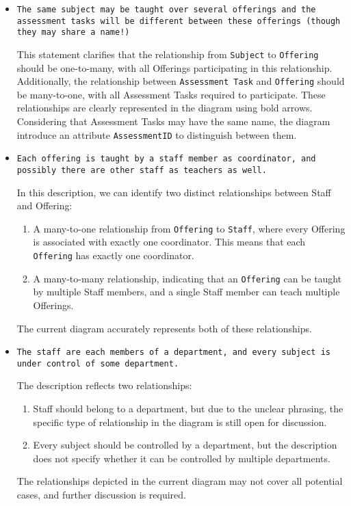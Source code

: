 \documentclass[a4paper,12pt]{article}
\begin{document}
\begin{itemize}
  \item \texttt{The same subject may be taught over several offerings and the assessment tasks will be different between these offerings (though they may share a name!)}

  This statement clarifies that the relationship from \texttt{Subject} to \texttt{Offering} should be one-to-many, with all Offerings participating in this relationship. Additionally, the relationship between \texttt{Assessment Task} and \texttt{Offering} should be many-to-one, with all Assessment Tasks required to participate. These relationships are clearly represented in the diagram using bold arrows. Considering that Assessment Tasks may have the same name, the diagram introduce an attribute \texttt{AssessmentID} to distinguish between them.

  \item \texttt{Each offering is taught by a staff member as coordinator, and possibly there are other staff as teachers as well. }

  In this description, we can identify two distinct relationships between Staff and Offering:
  \begin{enumerate}
    \item A many-to-one relationship from \texttt{Offering} to \texttt{Staff}, where every Offering is associated with exactly one coordinator. This means that each \texttt{Offering} has exactly one coordinator.

    \item A many-to-many relationship, indicating that an \texttt{Offering} can be taught by multiple Staff members, and a single Staff member can teach multiple Offerings.
  \end{enumerate}

  The current diagram accurately represents both of these relationships.


  \item \texttt{The staff are each members of a department, and every subject is under control of some department.}

  The description reflects two relationships:
    \begin{enumerate}
        \item Staff should belong to a department, but due to the unclear phrasing, the specific type of relationship in the diagram is still open for discussion.

        \item Every subject should be controlled by a department, but the description does not specify whether it can be controlled by multiple departments.
    \end{enumerate}
  The relationships depicted in the current diagram may not cover all potential cases, and further discussion is required.


\end{itemize}
\end{document}

